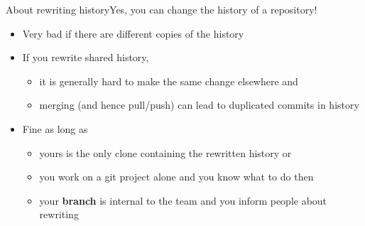 \documentclass[usenames,svgnames,14pt]{beamer}
\begin{document}
\begin{frame}{About rewriting history}{Yes, you can change the history of a repository!}
    \vspace{6mm}
    \begin{overlayarea}{\textwidth}{0.3\textheight}
        \setlength{\leftmargini}{5mm}
        \begin{itemize}
            \item\alert{Very bad if there are different copies of the history} 
            \item If you rewrite shared history,\\
                  \begin{itemize}
                      \item it is generally hard to make the same change elsewhere and\\
                      \item merging (and hence pull/push) can lead to duplicated commits in history
                  \end{itemize}
            \item<only@1> Fine as long as\\
                  \begin{itemize}
                      \item yours is the only clone containing the rewritten history or
                      \item you work on a git project alone and you know what to do then
                      \item your \textbf{branch} is internal to the team and you inform people about rewriting
                  \end{itemize}
        \end{itemize}
    \end{overlayarea}
    \vspace{-5mm}
    \begin{center}
\end{center}
\end{frame}
\end{document}
